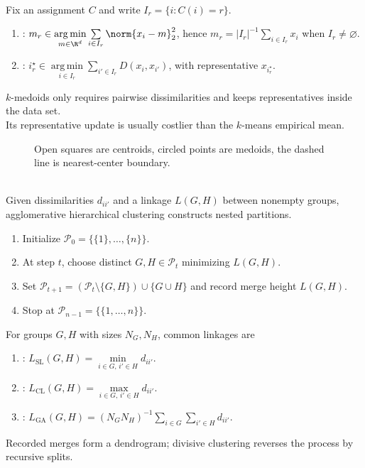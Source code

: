 \begin{remark} \label{rem:sl-kmedoids-versus-kmeans} \\
Fix an assignment $C$ and write $I_r=\{i:C(i)=r\}$.
\begin{enumerate}[label=(\roman*)]
\setlength{\itemsep}{0pt}
\item {}: $m_r\in\operatorname*{arg\,min}\limits_{m\in\R^d}\sum\limits_{i\in I_r}\norm{x_i-m}_2^2$, hence $m_r=|I_r|^{-1}\sum\limits_{i\in I_r}x_i$ when $I_r\neq\varnothing$.
\item {}: $i_r^\star\in\operatorname*{arg\,min}\limits_{i\in I_r}\sum\limits_{i'\in I_r}D(x_i,x_{i'})$, with representative $x_{i_r^\star}$.
\end{enumerate}
$k$-medoids only requires pairwise dissimilarities and keeps representatives inside the data set.\\
Its representative update is usually costlier than the $k$-means empirical mean.
\end{remark}

\begin{figure}[H]
\centering

\caption{Open squares are centroids, circled points are medoids, the dashed line is nearest-center boundary.}
\label{fig:sl-clustering-centroids-medoids}
\end{figure}

\begin{method} \label{meth:sl-hierarchical-clustering} \\
Given dissimilarities $d_{ii'}$ and a linkage $L(G,H)$ between nonempty groups, agglomerative hierarchical clustering constructs nested partitions.
\begin{enumerate}[label=(\roman*)]
\setlength{\itemsep}{0pt}
\item Initialize $\mathcal P_0=\{\{1\},\ldots,\{n\}\}$.
\item At step $t$, choose distinct $G,H\in\mathcal P_t$ minimizing $L(G,H)$.
\item Set $\mathcal P_{t+1}=(\mathcal P_t\setminus\{G,H\})\cup\{G\cup H\}$ and record merge height $L(G,H)$.
\item Stop at $\mathcal P_{n-1}=\{\{1,\ldots,n\}\}$.
\end{enumerate}
For groups $G,H$ with sizes $N_G,N_H$, common linkages are
\begin{enumerate}[label=(\roman*)]
\setlength{\itemsep}{0pt}
\item {}: $L_{\mathrm{SL}}(G,H)=\min\limits_{i\in G,\,i'\in H}d_{ii'}$.
\item {}: $L_{\mathrm{CL}}(G,H)=\max\limits_{i\in G,\,i'\in H}d_{ii'}$.
\item {}: $L_{\mathrm{GA}}(G,H)=(N_GN_H)^{-1}\sum\limits_{i\in G}\sum\limits_{i'\in H}d_{ii'}$.
\end{enumerate}
Recorded merges form a dendrogram; divisive clustering reverses the process by recursive splits.
\end{method}

